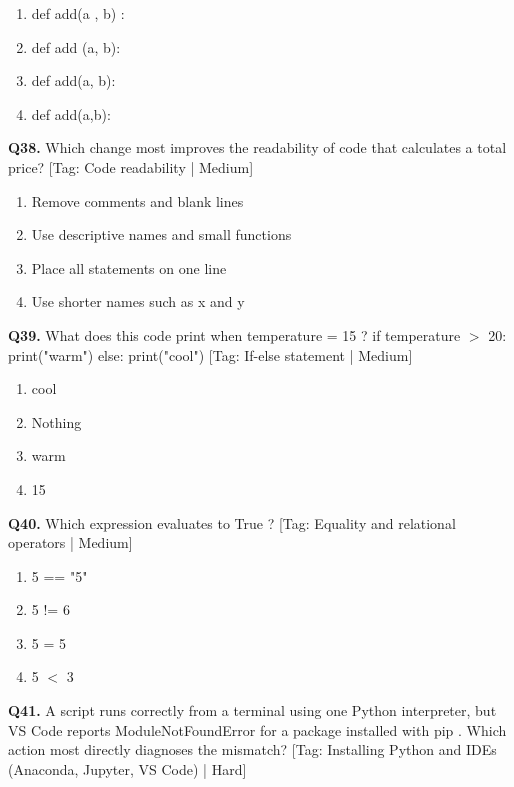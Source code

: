 \begin{enumerate}[label=(\alph*),topsep=2pt,itemsep=1pt,partopsep=0pt,parsep=0pt]
    \item {def add(a , b) :}
    \item {def add (a, b):}
    \item {def add(a, b):}
    \item {def add(a,b):}
\end{enumerate}
\vspace{2mm}
\noindent\textbf{Q38.} Which change most improves the readability of code that calculates a total price? \hfill [Tag: Code readability | Medium]
\begin{enumerate}[label=(\alph*),topsep=2pt,itemsep=1pt,partopsep=0pt,parsep=0pt]
    \item {Remove comments and blank lines}
    \item {Use descriptive names and small functions}
    \item {Place all statements on one line}
    \item {Use shorter names such as x and y}
\end{enumerate}
\vspace{2mm}
\noindent\textbf{Q39.} What does this code print when temperature = 15 ? if temperature $>$ 20: print("warm") else: print("cool") \hfill [Tag: If-else statement | Medium]
\begin{enumerate}[label=(\alph*),topsep=2pt,itemsep=1pt,partopsep=0pt,parsep=0pt]
    \item {cool}
    \item {Nothing}
    \item {warm}
    \item {15}
\end{enumerate}
\vspace{2mm}
\noindent\textbf{Q40.} Which expression evaluates to True ? \hfill [Tag: Equality and relational operators | Medium]
\begin{enumerate}[label=(\alph*),topsep=2pt,itemsep=1pt,partopsep=0pt,parsep=0pt]
    \item {5 == "5"}
    \item {5 != 6}
    \item {5 = 5}
    \item {5 $<$ 3}
\end{enumerate}
\vspace{2mm}
\noindent\textbf{Q41.} A script runs correctly from a terminal using one Python interpreter, but VS Code reports ModuleNotFoundError for a package installed with pip . Which action most directly diagnoses the mismatch? \hfill [Tag: Installing Python and IDEs (Anaconda, Jupyter, VS Code) | Hard]
